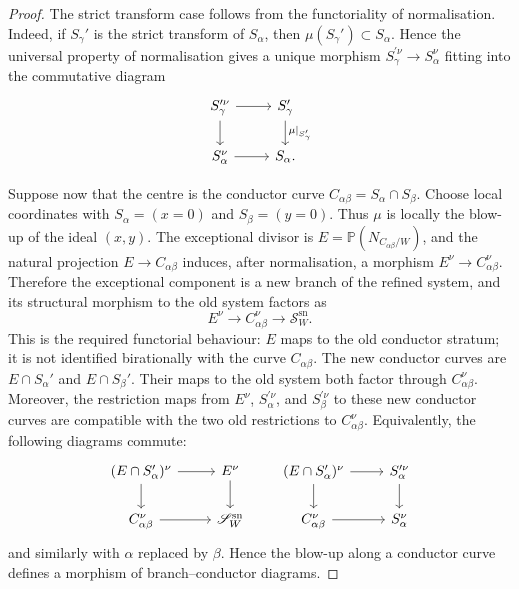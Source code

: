 \documentclass[11pt]{amsart}
\numberwithin{equation}{section}
\theoremstyle{plain}
\theoremstyle{definition}
\newcommand{\sn}{\mathrm{sn}}
\begin{document}
\begin{proof}
The strict transform case follows from the functoriality of normalisation. Indeed, if \(S_\gamma'\) is the strict transform of \(S_\alpha\), then \(\mu(S_\gamma')\subset S_\alpha\). Hence the universal property of normalisation gives a unique morphism \(S_\gamma^{\prime\nu}\to S_\alpha^\nu\) fitting into the commutative diagram
\[
\begin{tikzcd}
S_\gamma^{\prime\nu} \arrow[r] \arrow[d] &
S_\gamma' \arrow[d,"\mu|_{S_\gamma'}"]\\
S_\alpha^\nu \arrow[r] &
S_\alpha.
\end{tikzcd}
\]

Suppose now that the centre is the conductor curve \(C_{\alpha\beta}=S_\alpha\cap S_\beta\). Choose local coordinates with \(S_\alpha=(x=0)\) and \(S_\beta=(y=0)\). Thus \(\mu\) is locally the blow-up of the ideal \((x,y)\). The exceptional divisor is \(E=\mathbb P(N_{C_{\alpha\beta}/W})\), and the natural projection \(E\to C_{\alpha\beta}\) induces, after normalisation, a morphism \(E^\nu\to C_{\alpha\beta}^\nu\). Therefore the exceptional component is a new branch of the refined system, and its structural morphism to the old system factors as
\[
E^\nu\longrightarrow C_{\alpha\beta}^\nu\longrightarrow \mathscr S_W^{\sn}.
\]
This is the required functorial behaviour: \(E\) maps to the old conductor stratum; it is not identified birationally with the curve \(C_{\alpha\beta}\).
The new conductor curves are \(E\cap S_\alpha'\) and \(E\cap S_\beta'\). Their maps to the old system both factor through \(C_{\alpha\beta}^\nu\). Moreover, the restriction maps from \(E^\nu\), \(S_\alpha^{\prime\nu}\), and \(S_\beta^{\prime\nu}\) to these new conductor curves are compatible with the two old restrictions to \(C_{\alpha\beta}^\nu\). Equivalently, the following diagrams commute:
\[
\begin{tikzcd}
(E\cap S_\alpha')^\nu \arrow[r] \arrow[d] &
E^\nu \arrow[d]\\
C_{\alpha\beta}^\nu \arrow[r] &
\mathscr S_W^{\sn}
\end{tikzcd}
\qquad
\begin{tikzcd}
(E\cap S_\alpha')^\nu \arrow[r] \arrow[d] &
S_\alpha^{\prime\nu} \arrow[d]\\
C_{\alpha\beta}^\nu \arrow[r] &
S_\alpha^\nu
\end{tikzcd}
\]
and similarly with \(\alpha\) replaced by \(\beta\). Hence the blow-up along a conductor curve defines a morphism of branch--conductor diagrams.


\end{proof}
\end{document}
